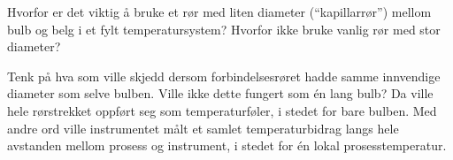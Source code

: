 
Hvorfor er det viktig å bruke et rør med liten diameter (``kapillarrør'') mellom bulb og belg i et fylt temperatursystem? Hvorfor ikke bruke vanlig rør med stor diameter?







Tenk på hva som ville skjedd dersom forbindelsesrøret hadde samme innvendige diameter som selve bulben. Ville ikke dette fungert som én lang bulb? Da ville hele rørstrekket oppført seg som temperaturføler, i stedet for bare bulben. Med andre ord ville instrumentet målt et samlet temperaturbidrag langs hele avstanden mellom prosess og instrument, i stedet for én lokal prosesstemperatur.









